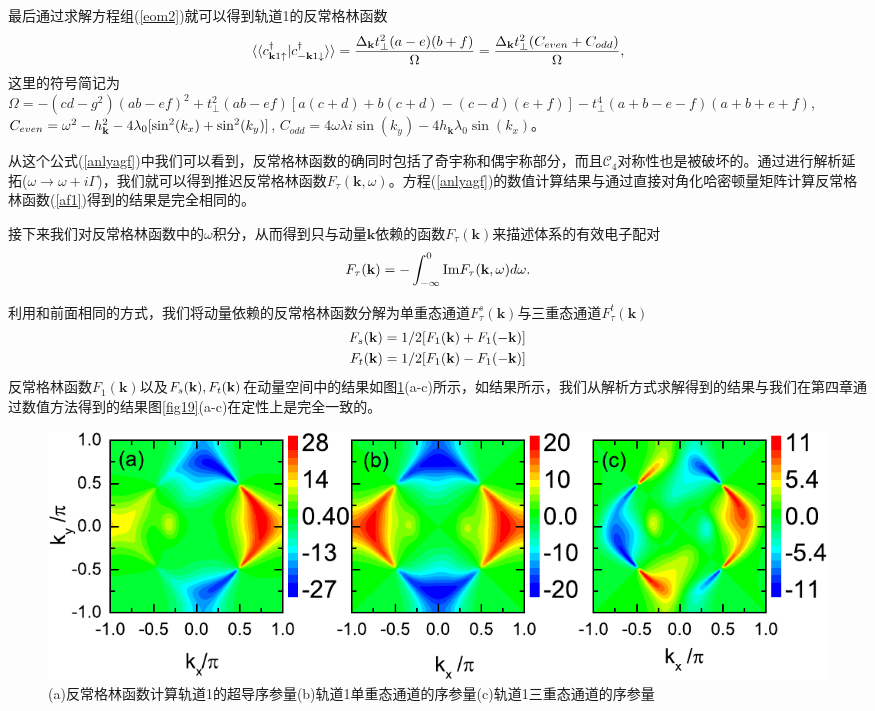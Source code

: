 最后通过求解方程组(\ref{eom2})就可以得到轨道1的反常格林函数
\begin{equation}
\langle\langle c_{{\bf k}1\uparrow}^\dagger|c_{-{\bf k}1\downarrow}^\dagger\rangle\rangle=\frac{\Delta_{\bf k} t_\perp ^2 (a-e) (b+f)}{\Omega}=\frac{\Delta_{\bf k}t_\perp^2(C_{even}+C_{odd})}{\Omega},\label{anlyagf}
\end{equation}
这里的符号简记为 $\Omega=-\left(c d-g^2\right) (a b-e f)^2+t_\perp ^2 (a b-e f) [a (c+d)+b (c+d)-(c-d) (e+f)]-t_\perp ^4 (a+b-e-f) (a+b+e+f)$, $C_{even}=\omega^2-h^2_{\bf{k}}-4\lambda_0[\sin^2(k_x)+\sin^2(k_y)]$, $C_{odd}=4\omega\lambda i\sin(k_y)-4h_{\mathbf{k}}\lambda_0\sin(k_x)$。

从这个公式(\ref{anlyagf})中我们可以看到，反常格林函数的确同时包括了奇宇称和偶宇称部分，而且$\mathcal{C}_4$对称性也是被破坏的。通过进行解析延拓($\omega\rightarrow\omega+i\Gamma$)，我们就可以得到推迟反常格林函数$F_\tau(\mathbf{k},\omega)$。方程(\ref{anlyagf})的数值计算结果与通过直接对角化哈密顿量矩阵计算反常格林函数(\ref{af1})得到的结果是完全相同的。

接下来我们对反常格林函数中的$\omega$积分，从而得到只与动量$\mathbf{k}$依赖的函数$F_\tau(\mathbf{k})$来描述体系的有效电子配对
\begin{equation}
F_\tau({\bf k})=-\int_{-\infty}^0\mathrm{Im}F_\tau({\bf k},\omega)d\omega.
\end{equation}

利用和前面相同的方式，我们将动量依赖的反常格林函数分解为单重态通道$F^s_\tau(\mathbf{k})$与三重态通道$F^t_\tau(\mathbf{k})$
\begin{equation}
\begin{aligned}
F_s({\bf k})&=1/2[F_1({\bf k})+F_1(-{\bf k})]\\
F_t({\bf k})&=1/2[F_1({\bf k})-F_1(-{\bf k})]
\end{aligned}
\end{equation}
反常格林函数$F_1(\mathbf{k})$以及$F_s({\bf k}),F_t({\bf k})$在动量空间中的结果如图\ref{fig21}(a-c)所示，如结果所示，我们从解析方式求解得到的结果与我们在第四章通过数值方法得到的结果图\ref{fig19}(a-c)在定性上是完全一致的。
\begin{figure}[h]
\centering
\includegraphics[scale=0.8]{pic/fig22}
\caption{(a)反常格林函数计算轨道1的超导序参量(b)轨道1单重态通道的序参量(c)轨道1三重态通道的序参量}\label{fig21}
\end{figure}
